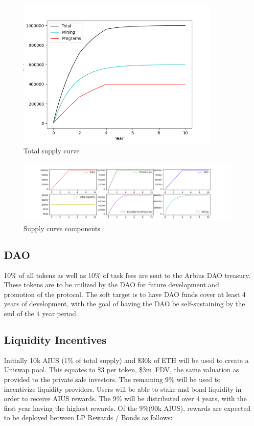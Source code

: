 \documentclass{article}
\begin{document}
\begin{figure}[h]
\caption{Total supply curve}
\centering
\includegraphics[width=0.9\textwidth]{combined}
\end{figure}

\begin{figure}[h]
    \caption{Supply curve components}
\centering
\includegraphics[width=1.0\textwidth]{separate}
\end{figure}

\newpage
\subsection{DAO}

10\% of all tokens as well as 10\% of task fees are sent to the Arbius DAO treasury. These tokens are to be utilized by the DAO for future development and promotion of the protocol. The soft target is to have DAO funds cover at least 4 years of development, with the goal of having the DAO be self-sustaining by the end of the 4 year period.

\subsection{Liquidity Incentives}

Initially 10k AIUS (1\% of total supply) and \$30k of ETH will be used to create a Uniswap pool. This equates to \$3 per token, \$3m~FDV, the same valuation as provided to the private sale investors. The remaining 9\% will be used to incentivize liquidity providers. Users will be able to stake and bond liquidity in order to receive AIUS rewards. The 9\% will be distributed over 4 years, with the first year having the highest rewards. Of the 9\%(90k AIUS), rewards are expected to be deployed between LP Rewards / Bonds as follows:
\end{document}
